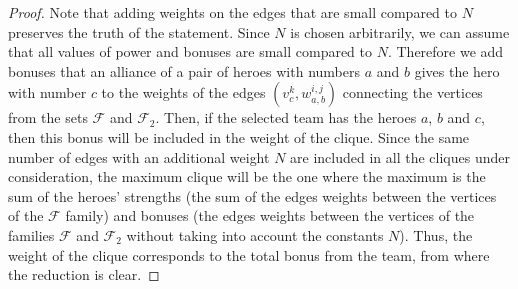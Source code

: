 \documentclass{article}
\begin{document}
\begin{proof}
    	 Note that adding weights on the edges that are small compared to $ N $ preserves the truth of the statement. Since $ N $ is chosen arbitrarily, we can assume that all values of power and bonuses are small compared to $ N $. Therefore we add bonuses that an alliance of a pair of heroes with numbers $ a $ and $ b $ gives the hero with number $ c $ to the weights of the edges  $ (v_c^{k}, w_{a, b}^{i, j}) $ connecting the vertices from the sets $\mathcal {F}$ and $\mathcal {F}_2$. Then, if the selected team has the heroes $a$, $b$ and $c$, then this bonus will be included in the weight of the clique. Since the same number of edges with an additional weight $ N$ are included in all the cliques under consideration, the maximum clique will be the one where the maximum is the sum of the heroes' strengths (the sum of the edges weights between the vertices of the $\mathcal {F} $ family) and bonuses (the edges weights between the vertices of the families $\mathcal{F}$ and $\mathcal {F}_2$ without taking into account the constants $N$). Thus, the weight of the clique corresponds to the total bonus from the team, from where the reduction is clear.
    
\end{proof}

\end{document}
